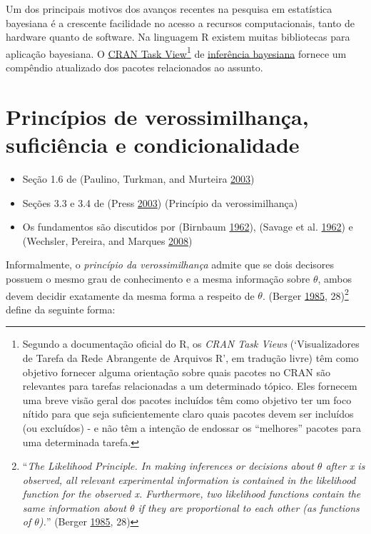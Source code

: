 \documentclass[
]{book}
\providecommand{\tightlist}{%
  \setlength{\itemsep}{0pt}\setlength{\parskip}{0pt}}
\theoremstyle{definition}
\theoremstyle{definition}
\theoremstyle{definition}
\theoremstyle{remark}
\begin{document}
Um dos principais motivos dos avanços recentes na pesquisa em estatística bayesiana é a crescente facilidade no acesso a recursos computacionais, tanto de hardware quanto de software. Na linguagem R existem muitas bibliotecas para aplicação bayesiana. O \href{https://cran.r-project.org/web/views/}{CRAN Task View}\footnote{Segundo a documentação oficial do R, os \emph{CRAN Task Views} (`Visualizadores de Tarefa da Rede Abrangente de Arquivos R', em tradução livre) têm como objetivo fornecer alguma orientação sobre quais pacotes no CRAN são relevantes para tarefas relacionadas a um determinado tópico. Eles fornecem uma breve visão geral dos pacotes incluídos têm como objetivo ter um foco nítido para que seja suficientemente claro quais pacotes devem ser incluídos (ou excluídos) - e não têm a intenção de endossar os ``melhores'' pacotes para uma determinada tarefa.} de \href{https://cran.r-project.org/view=Bayesian}{inferência bayesiana} fornece um compêndio atualizado dos pacotes relacionados ao assunto.

\hypertarget{princuxedpios-de-verossimilhanuxe7a-suficiuxeancia-e-condicionalidade}{%
\section{Princípios de verossimilhança, suficiência e condicionalidade}\label{princuxedpios-de-verossimilhanuxe7a-suficiuxeancia-e-condicionalidade}}

\begin{itemize}
\tightlist
\item
  Seção 1.6 de (Paulino, Turkman, and Murteira \protect\hyperlink{ref-paulino2003estatistica}{2003})\\
\item
  Seções 3.3 e 3.4 de (Press \protect\hyperlink{ref-press2003subjective}{2003}) (Princípio da verossimilhança)\\
\item
  Os fundamentos são discutidos por (Birnbaum \protect\hyperlink{ref-birnbaum1962foundations}{1962}), (Savage et al. \protect\hyperlink{ref-savage1962foundations}{1962}) e (Wechsler, Pereira, and Marques \protect\hyperlink{ref-wechsler2008birnbaum}{2008})
\end{itemize}

Informalmente, o \emph{princípio da verossimilhança} admite que se dois decisores possuem o mesmo grau de conhecimento e a mesma informação sobre \(\theta\), ambos devem decidir exatamente da mesma forma a respeito de \(\theta\). (Berger \protect\hyperlink{ref-berger1985statistical}{1985}, 28)\footnote{``\emph{The Likelihood Principle. In making inferences or decisions about \(\theta\) after x is observed, all relevant experimental information is contained in the likelihood function for the observed x. Furthermore, two likelihood functions contain the same information about \(\theta\) if they are proportional to each other (as functions of \(\theta\)).}'' (Berger \protect\hyperlink{ref-berger1985statistical}{1985}, 28)} define da seguinte forma:
\end{document}
